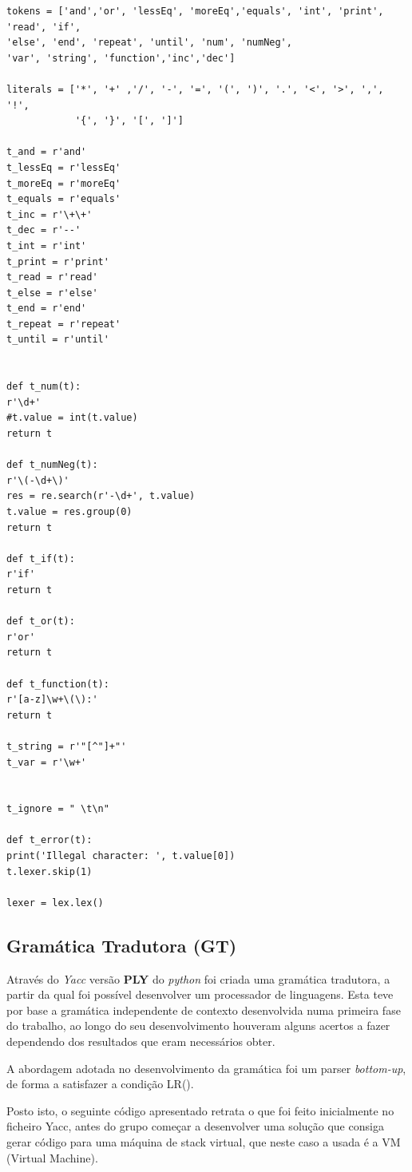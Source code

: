 \documentclass[11pt,a4paper]{report}
\begin{document}
\vspace{3ex}
\begin{verbatim}
tokens = ['and','or', 'lessEq', 'moreEq','equals', 'int', 'print', 'read', 'if',
'else', 'end', 'repeat', 'until', 'num', 'numNeg',
'var', 'string', 'function','inc','dec']

literals = ['*', '+' ,'/', '-', '=', '(', ')', '.', '<', '>', ',', '!', 
            '{', '}', '[', ']']

t_and = r'and'
t_lessEq = r'lessEq'
t_moreEq = r'moreEq'
t_equals = r'equals'
t_inc = r'\+\+'
t_dec = r'--'
t_int = r'int'
t_print = r'print'
t_read = r'read'
t_else = r'else'
t_end = r'end'
t_repeat = r'repeat'
t_until = r'until'


def t_num(t):
r'\d+'
#t.value = int(t.value)
return t

def t_numNeg(t):
r'\(-\d+\)'
res = re.search(r'-\d+', t.value)
t.value = res.group(0)
return t

def t_if(t):
r'if'
return t

def t_or(t):
r'or'
return t

def t_function(t):
r'[a-z]\w+\(\):'
return t

t_string = r'"[^"]+"'
t_var = r'\w+'


t_ignore = " \t\n"

def t_error(t):
print('Illegal character: ', t.value[0])
t.lexer.skip(1)

lexer = lex.lex()

\end{verbatim}

\subsection{Gramática Tradutora (GT)}
\qquad Através do \textit{Yacc} versão \textbf{PLY} do \textit{python} foi criada uma gramática tradutora, a partir da qual foi possível desenvolver um processador de linguagens. Esta teve por base a gramática independente de contexto desenvolvida numa primeira fase do trabalho, ao longo do seu desenvolvimento houveram alguns acertos a fazer dependendo dos resultados que eram necessários obter.\par
\qquad A abordagem adotada no desenvolvimento da gramática foi um parser \textit{bottom-up}, de forma a satisfazer a condição LR().\par
\qquad Posto isto, o seguinte código apresentado retrata o que foi feito inicialmente no ficheiro Yacc, antes do grupo começar a desenvolver uma solução que consiga gerar código para uma máquina de stack virtual, que neste caso a usada é a VM (Virtual Machine).
\end{document}
